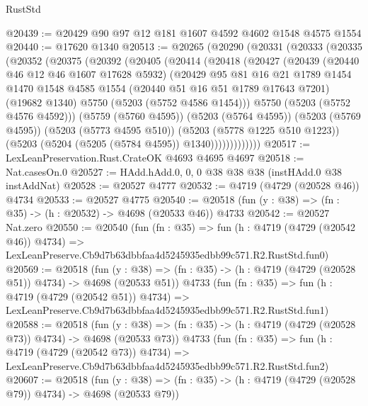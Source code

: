 \begin{lexlean}{RustStd}
\begin{coremodule}
@20439 := @20429 @90 @97 @12 @181 @1607 @4592 @4602 @1548 @4575 @1554
@20440 := @17620 @1340
@20513 := @20265
    (@20290
      (@20331
        (@20333
          (@20335
            (@20352
              (@20375
                (@20392
                  (@20405
                    (@20414
                      (@20418
                        (@20427
                          (@20439
                            (@20440 @46 @12 @46 @1607 @17628 @5932)
                            (@20429
                              @95
                              @81
                              @16
                              @21
                              @1789
                              @1454
                              @1470
                              @1548
                              @4585
                              @1554
                              (@20440 @51 @16 @51 @1789 @17643 @7201)
                              (@19682 @1340)
                              @5750
                              (@5203 (@5752 @4586 @1454)))
                            @5750
                            (@5203 (@5752 @4576 @4592)))
                          (@5759 (@5760 @4595))
                          (@5203 (@5764 @4595))
                          (@5203 (@5769 @4595))
                          (@5203 (@5773 @4595 @510))
                          (@5203 (@5778 @1225 @510 @1223))
                          (@5203 (@5204 (@5205 (@5784 @4595)) @1340)))))))))))))
@20517 := LexLeanPreservation.Rust.CrateOK @4693 @4695 @4697
@20518 := Nat.casesOn.{0}
@20527 := HAdd.hAdd.{0, 0, 0} @38 @38 @38 (instHAdd.{0} @38 instAddNat)
@20528 := @20527 @4777
@20532 := @4719 (@4729 (@20528 @46)) @4734
@20533 := @20527 @4775
@20540 := @20518 (fun (y : @38) => (fn : @35) -> (h : @20532) -> @4698 (@20533 @46)) @4733
@20542 := @20527 Nat.zero
@20550 := @20540
    (fun (fn : @35) =>
    fun (h : @4719 (@4729 (@20542 @46)) @4734) =>
    LexLeanPreserve.Cb9d7b63dbbfaa4d5245935edbb99c571.R2.RustStd.fun0)
@20569 := @20518
    (fun (y : @38) => (fn : @35) -> (h : @4719 (@4729 (@20528 @51)) @4734) -> @4698 (@20533 @51))
    @4733
    (fun (fn : @35) =>
    fun (h : @4719 (@4729 (@20542 @51)) @4734) =>
    LexLeanPreserve.Cb9d7b63dbbfaa4d5245935edbb99c571.R2.RustStd.fun1)
@20588 := @20518
    (fun (y : @38) => (fn : @35) -> (h : @4719 (@4729 (@20528 @73)) @4734) -> @4698 (@20533 @73))
    @4733
    (fun (fn : @35) =>
    fun (h : @4719 (@4729 (@20542 @73)) @4734) =>
    LexLeanPreserve.Cb9d7b63dbbfaa4d5245935edbb99c571.R2.RustStd.fun2)
@20607 := @20518
    (fun (y : @38) => (fn : @35) -> (h : @4719 (@4729 (@20528 @79)) @4734) -> @4698 (@20533 @79))

\end{coremodule}
\end{lexlean}
